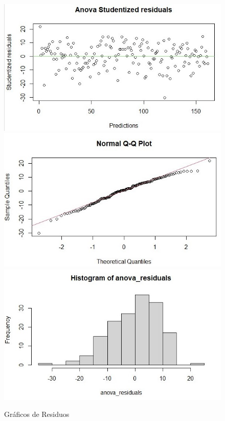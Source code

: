 \documentclass[a4paper,10pt,twocolumn]{article}
\begin{document}
\begin{figure}[h]
	\includegraphics[scale=0.5]{./imgs/anova_residuals.jpg}
	\includegraphics[scale=0.5]{./imgs/anova_qq.jpg}
	\includegraphics[scale=0.5]{./imgs/anova_hist.jpg}
	\caption{Gráficos de Residuos}
\end{figure}
\end{document}

